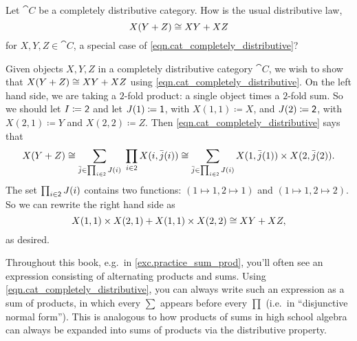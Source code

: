 \documentclass[Book-Poly]{subfiles}
\begin{document}
\begin{exercise}
Let $\cat{C}$ be a completely distributive category.
How is the usual distributive law,
\[
    X(Y+Z)\cong XY+XZ
\]
for $X,Y,Z\in\cat{C}$, a special case of \eqref{eqn.cat_completely_distributive}?
\begin{solution}
Given objects $X,Y,Z$ in a completely distributive category $\cat{C}$, we wish to show that $X(Y+Z)\cong XY+XZ$ using \eqref{eqn.cat_completely_distributive}.
On the left hand side, we are taking a $2$-fold product: a single object times a $2$-fold sum.
So we should let $I\coloneqq\textsf{2}$ and let $J(1)\coloneqq\textsf{1}$, with $X(1,1)\coloneqq X$, and $J(2)\coloneqq\textsf{2}$, with $X(2,1)\coloneqq Y$ and $X(2,2)\coloneqq Z$.
Then \eqref{eqn.cat_completely_distributive} says that
\[
    X(Y+Z) \cong \sum_{\bar{j}\in\prod_{i\in\textsf{2}}J(i)}\;\prod_{i\in \textsf{2}}X(i,\bar{j}(i)) \cong \sum_{\bar{j}\in\prod_{i\in\textsf{2}}J(i)}X(1,\bar{j}(1))\times X(2,\bar{j}(2)).
\]
The set $\prod_{i\in\textsf{2}}J(i)$ contains two functions: $(1\mapsto1,2\mapsto1)$ and $(1\mapsto1,2\mapsto2)$.
So we can rewrite the right hand side as
\[
    X(1,1)\times X(2,1)+X(1,1)\times X(2,2)\cong XY+XZ,
\]
as desired.
\end{solution}
\end{exercise}

Throughout this book, e.g.\ in \cref{exc.practice_sum_prod}, you'll often see an expression consisting of alternating products and sums.
Using \eqref{eqn.cat_completely_distributive}, you can always write such an expression as a sum of products, in which every $\sum$ appears before every $\prod$ (i.e.\ in ``disjunctive normal form'').
This is analogous to how products of sums in high school algebra can always be expanded into sums of products via the distributive property.
\end{document}
